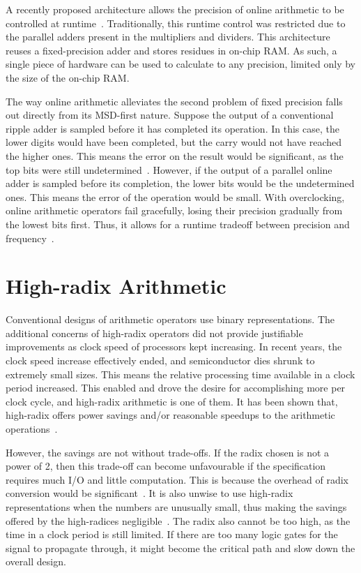 A recently proposed architecture allows the precision of online arithmetic to be controlled at runtime~\cite{Zhao1}.
Traditionally, this runtime control was restricted due to the parallel adders present in the multipliers and dividers.
This architecture reuses a fixed-precision adder and stores residues in on-chip RAM.
As such, a single piece of hardware can be used to calculate to any precision, limited only by the size of the on-chip RAM.

The way online arithmetic alleviates the second problem of fixed precision falls out directly from its MSD-first nature.
Suppose the output of a conventional ripple adder is sampled before it has completed its operation.
In this case, the lower digits would have been completed, but the carry would not have reached the higher ones.
This means the error on the result would be significant, as the top bits were still undetermined~\cite{Shi1}.
However, if the output of a parallel online adder is sampled before its completion, the lower bits would be the undetermined ones.
This means the error of the operation would be small.
With overclocking, online arithmetic operators fail gracefully, losing their precision gradually from the lowest bits first.
Thus, it allows for a runtime tradeoff between precision and frequency~\cite{Shi2}.

\section{High-radix Arithmetic}
Conventional designs of arithmetic operators use binary representations.
The additional concerns of high-radix operators did not provide justifiable improvements as clock speed of processors kept increasing.
In recent years, the clock speed increase effectively ended, and semiconductor dies shrunk to extremely small sizes.
This means the relative processing time available in a clock period increased.
This enabled and drove the desire for accomplishing more per clock cycle, and high-radix arithmetic is one of them.
It has been shown that, high-radix offers power savings and/or reasonable speedups to the arithmetic operations~\cite{Catanzaro1}\cite{Amin1}\cite{Chen1}.

However, the savings are not without trade-offs.
If the radix chosen is not a power of 2, then this trade-off can become unfavourable if the specification requires much I/O and little computation.
This is because the overhead of radix conversion would be significant~\cite{Whyte1}.
It is also unwise to use high-radix representations when the numbers are unusually small, thus making the savings offered by the high-radices negligible~\cite{Catanzaro1}.
The radix also cannot be too high, as the time in a clock period is still limited.
If there are too many logic gates for the signal to propagate through, it might become the critical path and slow down the overall design.

